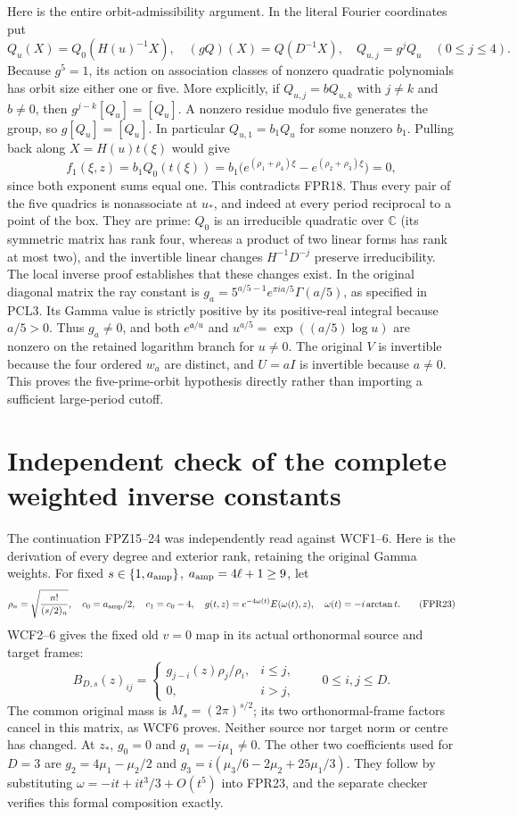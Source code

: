 \documentclass[11pt]{article}
\newcommand{\C}{\mathbb C}
\begin{document}
Here is the entire orbit-admissibility argument. In the literal
Fourier coordinates put
\[
 Q_u(X)=Q_0(H(u)^{-1}X),\quad
 (gQ)(X)=Q(D^{-1}X),\quad Q_{u,j}=g^jQ_u\quad(0\le j\le4).
 \tag{FPR21}
\]
Because $g^5=1$, its action on association classes of nonzero
quadratic polynomials has orbit size either one or five.
More explicitly, if $Q_{u,j}=bQ_{u,k}$ with $j\ne k$ and
$b\ne0$, then $g^{j-k}[Q_u]=[Q_u]$. A nonzero residue modulo
five generates the group, so $g[Q_u]=[Q_u]$. In particular
$Q_{u,1}=b_1Q_u$ for some nonzero $b_1$.
Pulling back along $X=H(u)t(\xi)$ would give
\[
 f_1(\xi,z)=b_1Q_0(t(\xi))
 =b_1\bigl(e^{(\rho_1+\rho_4)\xi}
             -e^{(\rho_2+\rho_3)\xi}\bigr)=0,
 \tag{FPR22}
\]
since both exponent sums equal one. This contradicts FPR18.
Thus every pair of the five quadrics is nonassociate at $u_*$,
and indeed at every period reciprocal to a point of the box.
They are prime: $Q_0$ is an irreducible quadratic over $\C$
(its symmetric matrix has rank four, whereas a product of two
linear forms has rank at most two), and the invertible linear
changes $H^{-1}D^{-j}$ preserve irreducibility. The local
inverse proof establishes that these changes exist. In the
original diagonal matrix the ray constant is
$g_a=5^{a/5-1}e^{\pi ia/5}\Gamma(a/5)$, as specified in PCL3.
Its Gamma value is strictly positive by its positive-real
integral because $a/5>0$. Thus $g_a\ne0$, and both
$e^{\mathfrak a/u}$ and $u^{a/5}=\exp((a/5)\log u)$ are
nonzero on the retained logarithm branch for $u\ne0$.
The original $V$ is invertible because the four ordered
$w_a$ are distinct, and $U=aI$ is invertible because $a\ne0$.
This proves the five-prime-orbit hypothesis directly rather
than importing a sufficient large-period cutoff.

\section{Independent check of the complete weighted inverse constants}
The continuation FPZ15--24 was independently read against WCF1--6.
Here is the derivation of every degree and exterior rank, retaining
the original Gamma weights. For fixed $s\in\{1,a_{\rm amp}\}$,
$a_{\rm amp}=4\ell+1\ge9$, let
\[
 \rho_n=\sqrt{\frac{n!}{(s/2)_n}},\quad
 c_0=a_{\rm amp}/2,\quad c_1=c_0-4,\quad
 g(t,z)=e^{-4\omega(t)}E(\omega(t),z),\quad
 \omega(t)=-i\arctan t.
 \tag{FPR23}
\]
WCF2--6 gives the fixed old $v=0$ map in its actual
orthonormal source and target frames:
\[
 B_{D,s}(z)_{ij}=\begin{cases}
  g_{j-i}(z)\rho_j/\rho_i,&i\le j,\\0,&i>j,
 \end{cases}\qquad0\le i,j\le D.
 \tag{FPR24}
\]
The common original mass is $M_s=(2\pi)^{s/2}$; its two
orthonormal-frame factors cancel in this matrix, as WCF6 proves.
Neither source nor target norm or centre has changed.
At $z_*$, $g_0=0$ and $g_1=-i\mu_1\ne0$.
The other two coefficients used for $D=3$ are
$g_2=4\mu_1-\mu_2/2$ and
$g_3=i(\mu_3/6-2\mu_2+25\mu_1/3)$.
They follow by substituting
$\omega=-it+it^3/3+O(t^5)$ into FPR23, and the separate checker
verifies this formal composition exactly.
\end{document}
